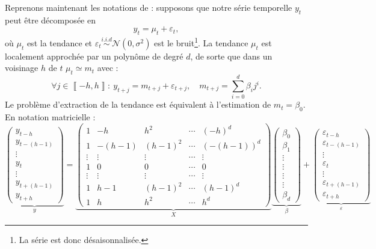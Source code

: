 \documentclass[
  12pt,
  a4paper,french]{article}
\newcommand\1{\mathds{1}}
\begin{document}
Reprenons maintenant les notations de \textcite{proietti2008} : supposons que notre série temporelle \(y_t\) peut être décomposée en
\[
y_t=\mu_t+\varepsilon_t,
\]
où \(\mu_t\) est la tendance et \(\varepsilon_{t}\overset{i.i.d}{\sim}\mathcal{N}(0,\sigma^{2})\) est le bruit\footnote{La série est donc désaisonnalisée.}.
La tendance \(\mu_t\) est localement approchée par un polynôme de degré \(d\), de sorte que dans un voisinage \(h\) de \(t\) \(\mu_t\simeq m_{t}\) avec :
\[
\forall j\in\left\llbracket -h,h\right\rrbracket :\:
y_{t+j}=m_{t+j}+\varepsilon_{t+j},\quad m_{t+j}=\sum_{i=0}^{d}\beta_{i}j^{i}.
\]
Le problème d'extraction de la tendance est équivalent à l'estimation de \(m_t=\beta_0\).
En notation matricielle :
\[
\underbrace{\begin{pmatrix}y_{t-h}\\
y_{t-(h-1)}\\
\vdots\\
y_{t}\\
\vdots\\
y_{t+(h-1)}\\
y_{t+h}
\end{pmatrix}}_{y}=\underbrace{\begin{pmatrix}1 & -h & h^{2} & \cdots & (-h)^{d}\\
1 & -(h-1) & (h-1)^{2} & \cdots & (-(h-1))^{d}\\
\vdots & \vdots & \vdots & \cdots & \vdots\\
1 & 0 & 0 & \cdots & 0\\
\vdots & \vdots & \vdots & \cdots & \vdots\\
1 & h-1 & (h-1)^{2} & \cdots & (h-1)^{d}\\
1 & h & h^{2} & \cdots & h^{d}
\end{pmatrix}}_{X}\underbrace{\begin{pmatrix}\beta_{0}\\
\beta_{1}\\
\vdots\\
\vdots\\
\vdots\\
\vdots\\
\beta_{d}
\end{pmatrix}}_{\beta}+\underbrace{\begin{pmatrix}\varepsilon_{t-h}\\
\varepsilon_{t-(h-1)}\\
\vdots\\
\varepsilon_{t}\\
\vdots\\
\varepsilon_{t+(h-1)}\\
\varepsilon_{t+h}
\end{pmatrix}}_{\varepsilon}
\]
\end{document}
